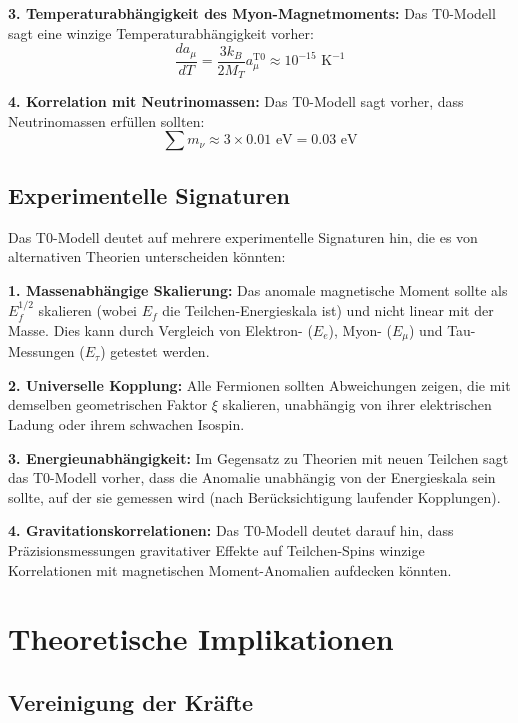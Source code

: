 \documentclass[12pt,a4paper]{article}
\newcommand{\xigeom}{\xi}
\newcommand{\Ee}{E_e}
\newcommand{\Emu}{E_{\mu}}
\begin{document}
\textbf{3. Temperaturabhängigkeit des Myon-Magnetmoments:}
Das T0-Modell sagt eine winzige Temperaturabhängigkeit vorher:
\begin{equation}
\frac{da_\mu}{dT} = \frac{3k_B}{2M_T} a_\mu^{\text{T0}} \approx 10^{-15} \text{ K}^{-1}
\end{equation}

\textbf{4. Korrelation mit Neutrinomassen:}
Das T0-Modell sagt vorher, dass Neutrinomassen erfüllen sollten:
\begin{equation}
\sum m_\nu \approx 3 \times 0.01 \text{ eV} = 0.03 \text{ eV}
\end{equation}

\subsection{Experimentelle Signaturen}

Das T0-Modell deutet auf mehrere experimentelle Signaturen hin, die es von alternativen Theorien unterscheiden könnten:

\textbf{1. Massenabhängige Skalierung:}
Das anomale magnetische Moment sollte als $E_f^{1/2}$ skalieren (wobei $E_f$ die Teilchen-Energieskala ist) und nicht linear mit der Masse. Dies kann durch Vergleich von Elektron- ($\Ee$), Myon- ($\Emu$) und Tau-Messungen ($E_\tau$) getestet werden.

\textbf{2. Universelle Kopplung:}
Alle Fermionen sollten Abweichungen zeigen, die mit demselben geometrischen Faktor $\xigeom$ skalieren, unabhängig von ihrer elektrischen Ladung oder ihrem schwachen Isospin.

\textbf{3. Energieunabhängigkeit:}
Im Gegensatz zu Theorien mit neuen Teilchen sagt das T0-Modell vorher, dass die Anomalie unabhängig von der Energieskala sein sollte, auf der sie gemessen wird (nach Berücksichtigung laufender Kopplungen).

\textbf{4. Gravitationskorrelationen:}
Das T0-Modell deutet darauf hin, dass Präzisionsmessungen gravitativer Effekte auf Teilchen-Spins winzige Korrelationen mit magnetischen Moment-Anomalien aufdecken könnten.

\section{Theoretische Implikationen}

\subsection{Vereinigung der Kräfte}
\end{document}
